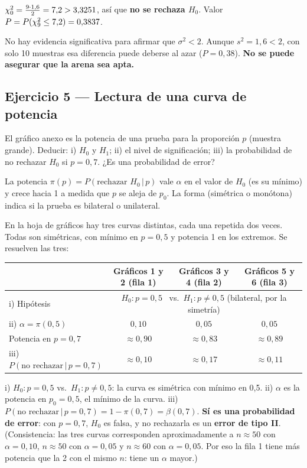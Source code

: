  $\chi^2_0=\frac{9\cdot1{,}6}{2}=7{,}2>3{,}3251$, así que \textbf{no se rechaza $H_0$}. Valor $P=P(\chi^2_9\le7{,}2)=0{,}3837$.
\begin{resp}
No hay evidencia significativa para afirmar que $\sigma^2<2$. Aunque $s^2=1{,}6<2$, con solo 10 muestras esa diferencia puede deberse al azar ($P=0{,}38$). \textbf{No se puede asegurar que la arena sea apta.}
\end{resp}

\subsection{Ejercicio 5 --- Lectura de una curva de potencia}
\begin{enun}
El gráfico anexo es la potencia de una prueba para la proporción $p$ (muestra grande). Deducir: i) $H_0$ y $H_1$; ii) el nivel de significación; iii) la probabilidad de no rechazar $H_0$ si $p=0{,}7$. ¿Es una probabilidad de error?
\end{enun}
\begin{metodo}
La potencia $\pi(p)=P(\text{rechazar }H_0\,|\,p)$ vale $\alpha$ en el valor de $H_0$ (es su mínimo) y crece hacia 1 a medida que $p$ se aleja de $p_0$. La forma (simétrica o monótona) indica si la prueba es bilateral o unilateral.
\end{metodo}
En la hoja de gráficos hay tres curvas distintas, cada una repetida dos veces. Todas son simétricas, con mínimo en $p=0{,}5$ y potencia 1 en los extremos. Se resuelven las tres:
\begin{center}
\small\renewcommand{\arraystretch}{1.3}
\begin{tabular}{@{}lccc@{}}
\toprule
& Gráficos 1 y 2 (fila 1) & Gráficos 3 y 4 (fila 2) & Gráficos 5 y 6 (fila 3)\\\midrule
i) Hipótesis & \multicolumn{3}{c}{$H_0:p=0{,}5$ \ vs.\ $H_1:p\neq0{,}5$ (bilateral, por la simetría)}\\
ii) $\alpha=\pi(0{,}5)$ & $0{,}10$ & $0{,}05$ & $0{,}05$\\
Potencia en $p=0{,}7$ & $\approx0{,}90$ & $\approx0{,}83$ & $\approx0{,}89$\\
iii) $P(\text{no rechazar}\,|\,p=0{,}7)$ & $\approx0{,}10$ & $\approx0{,}17$ & $\approx0{,}11$\\\bottomrule
\end{tabular}
\end{center}
\begin{resp}
i) $H_0:p=0{,}5$ vs.\ $H_1:p\neq0{,}5$: la curva es simétrica con mínimo en 0,5. \quad
ii) $\alpha$ es la potencia en $p_0=0{,}5$, el mínimo de la curva. \quad
iii) $P(\text{no rechazar}\,|\,p=0{,}7)=1-\pi(0{,}7)=\beta(0{,}7)$. \textbf{Sí es una probabilidad de error}: con $p=0{,}7$, $H_0$ es falsa, y no rechazarla es un \textbf{error de tipo II}.
(Consistencia: las tres curvas corresponden aproximadamente a $n\approx50$ con $\alpha=0{,}10$, $n\approx50$ con $\alpha=0{,}05$ y $n\approx60$ con $\alpha=0{,}05$. Por eso la fila 1 tiene más potencia que la 2 con el mismo $n$: tiene un $\alpha$ mayor.)
\end{resp}

